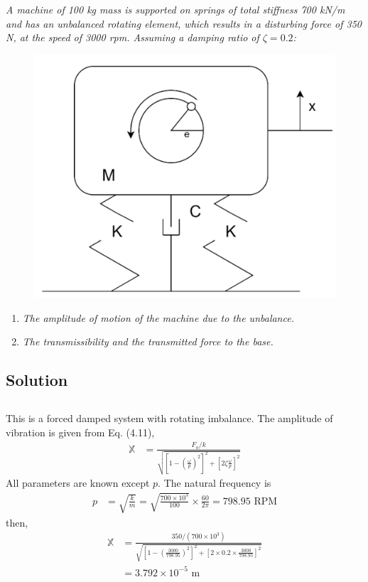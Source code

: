 \section{}
\textit{A machine of 100 kg mass is supported on springs of total stiffness 700 kN/m and has an unbalanced rotating element, which results in a disturbing force of 350 N, at the speed of 3000 rpm. Assuming a damping ratio of $\zeta = 0.2$:}
\begin{figure}[H]
    \centering
    \includegraphics[width=0.5\linewidth]{Questions/Figures/Q4 Problem Diagram.png}
\end{figure}
\begin{enumerate}[label=(\alph*)]
    \item \textit{The amplitude of motion of the machine due to the unbalance.}
    \item \textit{The transmissibility and the transmitted force to the base.}
\end{enumerate}

\subsection*{Solution}
\subsection{}
This is a forced damped system with rotating imbalance. The amplitude of vibration is given from Eq. (4.11),
\begin{align*}
    \mathbb{X} &= \frac{F_o/k}{\sqrt{\left[1 - \left(\frac{\omega}{p} \right)^2 \right]^2 + \left[2 \zeta \frac{\omega}{p} \right]^2}}
\end{align*}
All parameters are known except $p$. The natural frequency is
\begin{align*}
    p &= \sqrt{\frac{k}{m}} = \sqrt{\frac{700 \times 10^3}{100}} \times \frac{60}{2\pi} = 798.95 \text{ RPM}
\end{align*}
then,
\begin{align*}
    \mathbb{X} &= \frac{350/(700\times 10^3)}{\sqrt{\left[1 - \left(\frac{3000}{798.95} \right)^2 \right]^2 + \left[2 \times 0.2 \times \frac{3000}{798.95} \right]^2}} \\
    &= \boxed{3.792 \times 10^{-5} \text{ m}}
\end{align*}

\subsection{}
